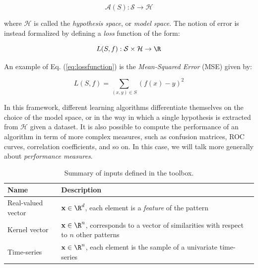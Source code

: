\begin{equation}
\mathcal{A}(S) : \mathcal{S} \rightarrow \mathcal{H}
\label{eq:learningalgorithm}
\end{equation}

\noindent where $\mathcal{H}$ is called the \textit{hypothesis space}, or \textit{model space}. The notion of error is instead formalized by defining a \textit{loss} function of the form:

\begin{equation}
L(S, f) :  \mathcal{S} \times \mathcal{H} \rightarrow \R
\label{eq:lossfunction}
\end{equation}

\noindent An example of Eq. (\ref{eq:lossfunction}) is the \textit{Mean-Squared Error} (MSE) given by:

\[
L(S, f) = \sum_{(x,y) \in S}(f(x) - y)^2
\]

\noindent In this framework, different learning algorithms differentiate themselves on the choice of the model space, or in the way in which a single hypothesis is extracted from $\mathcal{H}$ given a dataset. It is also possible to compute the performance of an algorithm in term of more complex measures, such as confusion matrices, ROC curves, correlation coefficients, and so on. In this case, we will talk more generally about \textit{performance measures}.
%
\begin{center}
\begin{table}[t]
{\centering\hfill{}
	\begin{tabular}{p{}p{}}
		\toprule
		Name & Description \\ 
		\midrule
		Real-valued vector & $\vect{x} \in \R^d$, each element is a \textit{feature} of the pattern  \\
		Kernel vector &  $\vect{x} \in \R^n$, corresponds to a vector of similarities with respect to $n$ other patterns \\
		Time-series & $\vect{x} \in \R^n$, each element is the sample of a univariate time-series \\
		\bottomrule
	\end{tabular}}
	\hfill{}
	\caption{Summary of inputs defined in the toolbox.}
	\label{tab:basicinputs}
\end{table}
\end{center}

